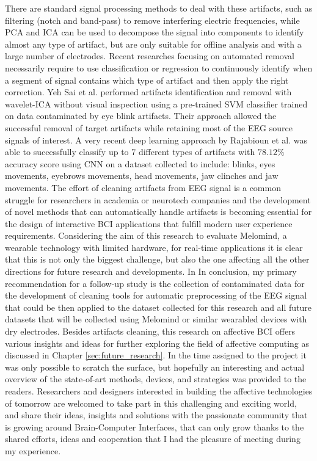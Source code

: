 There are standard signal processing methods to deal with these artifacts, such as filtering (notch and band-pass) to remove interfering electric frequencies, while \ac{PCA} and \ac{ICA} can be used to decompose the signal into components to identify almost any type of artifact, but are only suitable for offline analysis and with a large number of electrodes. Recent researches focusing on automated removal necessarily require to use classification or regression to continuously identify when a segment of signal contains which type of artifact and then apply the right correction. Yeh Sai et al. \cite{sai_automated_2018} performed artifacts identification and removal with wavelet-ICA without visual inspection using a pre-trained \ac{SVM} classifier trained on data contaminated by eye blink artifacts. Their approach allowed the successful removal of target artifacts while retaining most of the \ac{EEG} source signals of interest. A very recent deep learning approach by Rajabioun et al. \cite{rajabioun_deep_2021} was able to successfully classify up to 7 different types of artifacts with \(78.12\%\) accuracy score using \ac{CNN} on a dataset collected to include: blinks, eyes movements, eyebrows movements, head movements, jaw clinches and jaw movements. The effort of cleaning artifacts from \ac{EEG} signal is a common struggle for researchers in academia or neurotech companies and the development of novel methods that can automatically handle artifacts is becoming essential for the design of interactive \ac{BCI} applications that fulfill modern user experience requirements. Considering the aim of this research to evaluate Melomind, a wearable technology with limited hardware, for real-time applications it is clear that this is not only the biggest challenge, but also the one affecting all the other directions for future research and developments. In In conclusion, my primary recommendation for a follow-up study is the collection of contaminated data for the development of cleaning tools for automatic preprocessing of the \ac{EEG} signal that could be then applied to the dataset collected for this research and all future datasets that will be collected using Melomind or similar wearabled devices with dry electrodes. Besides artifacts cleaning, this research on affective \ac{BCI} offers various insights and ideas for further exploring the field of affective computing as discussed in Chapter \ref{sec:future_research}. In the time assigned to the project it was only possible to scratch the surface, but hopefully an interesting and actual overview of the state-of-art methods, devices, and strategies was provided to the readers. Researchers and designers interested in building the affective technologies of tomorrow are welcomed to take part in this challenging and exciting world, and share their ideas, insights and solutions with the passionate community that is growing around Brain-Computer Interfaces, that can only grow thanks to the shared efforts, ideas and cooperation that I had the pleasure of meeting during my experience.
